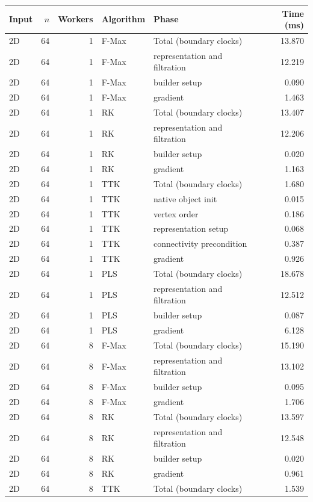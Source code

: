 \begin{tabular}{lrrllr}
\hline
Input & $n$ & Workers & Algorithm & Phase & Time (ms) \\
\hline
2D & 64 & 1 & F-Max & Total (boundary clocks) & 13.870 \\
2D & 64 & 1 & F-Max & representation and filtration & 12.219 \\
2D & 64 & 1 & F-Max & builder setup & 0.090 \\
2D & 64 & 1 & F-Max & gradient & 1.463 \\
2D & 64 & 1 & RK & Total (boundary clocks) & 13.407 \\
2D & 64 & 1 & RK & representation and filtration & 12.206 \\
2D & 64 & 1 & RK & builder setup & 0.020 \\
2D & 64 & 1 & RK & gradient & 1.163 \\
2D & 64 & 1 & TTK & Total (boundary clocks) & 1.680 \\
2D & 64 & 1 & TTK & native object init & 0.015 \\
2D & 64 & 1 & TTK & vertex order & 0.186 \\
2D & 64 & 1 & TTK & representation setup & 0.068 \\
2D & 64 & 1 & TTK & connectivity precondition & 0.387 \\
2D & 64 & 1 & TTK & gradient & 0.926 \\
2D & 64 & 1 & PLS & Total (boundary clocks) & 18.678 \\
2D & 64 & 1 & PLS & representation and filtration & 12.512 \\
2D & 64 & 1 & PLS & builder setup & 0.087 \\
2D & 64 & 1 & PLS & gradient & 6.128 \\
2D & 64 & 8 & F-Max & Total (boundary clocks) & 15.190 \\
2D & 64 & 8 & F-Max & representation and filtration & 13.102 \\
2D & 64 & 8 & F-Max & builder setup & 0.095 \\
2D & 64 & 8 & F-Max & gradient & 1.706 \\
2D & 64 & 8 & RK & Total (boundary clocks) & 13.597 \\
2D & 64 & 8 & RK & representation and filtration & 12.548 \\
2D & 64 & 8 & RK & builder setup & 0.020 \\
2D & 64 & 8 & RK & gradient & 0.961 \\
2D & 64 & 8 & TTK & Total (boundary clocks) & 1.539 \\

\end{tabular}
